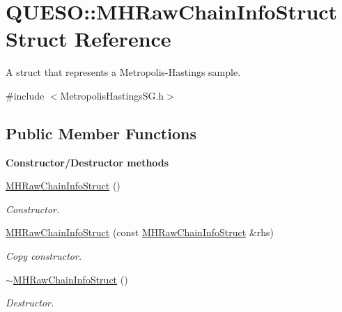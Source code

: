 \hypertarget{struct_q_u_e_s_o_1_1_m_h_raw_chain_info_struct}{\section{Q\-U\-E\-S\-O\-:\-:M\-H\-Raw\-Chain\-Info\-Struct Struct Reference}
\label{struct_q_u_e_s_o_1_1_m_h_raw_chain_info_struct}
}


A struct that represents a Metropolis-\/\-Hastings sample.  




{\ttfamily \#include $<$Metropolis\-Hastings\-S\-G.\-h$>$}

\subsection*{Public Member Functions}
\begin{Indent}{\bf Constructor/\-Destructor methods}\par
\begin{DoxyCompactItemize}
\item 
\hyperlink{struct_q_u_e_s_o_1_1_m_h_raw_chain_info_struct_a683362f09e3d50cd4ff82a4892aa8586}{M\-H\-Raw\-Chain\-Info\-Struct} ()
\begin{DoxyCompactList}\small\item\em Constructor. \end{DoxyCompactList}\item 
\hyperlink{struct_q_u_e_s_o_1_1_m_h_raw_chain_info_struct_aad713884a38d5cd99ae9072e53a6951a}{M\-H\-Raw\-Chain\-Info\-Struct} (const \hyperlink{struct_q_u_e_s_o_1_1_m_h_raw_chain_info_struct}{M\-H\-Raw\-Chain\-Info\-Struct} \&rhs)
\begin{DoxyCompactList}\small\item\em Copy constructor. \end{DoxyCompactList}\item 
\hyperlink{struct_q_u_e_s_o_1_1_m_h_raw_chain_info_struct_abafb2a4a1907f0d765120990ad0ab198}{$\sim$\-M\-H\-Raw\-Chain\-Info\-Struct} ()
\begin{DoxyCompactList}\small\item\em Destructor. \end{DoxyCompactList}\end{DoxyCompactItemize}
\end{Indent}
